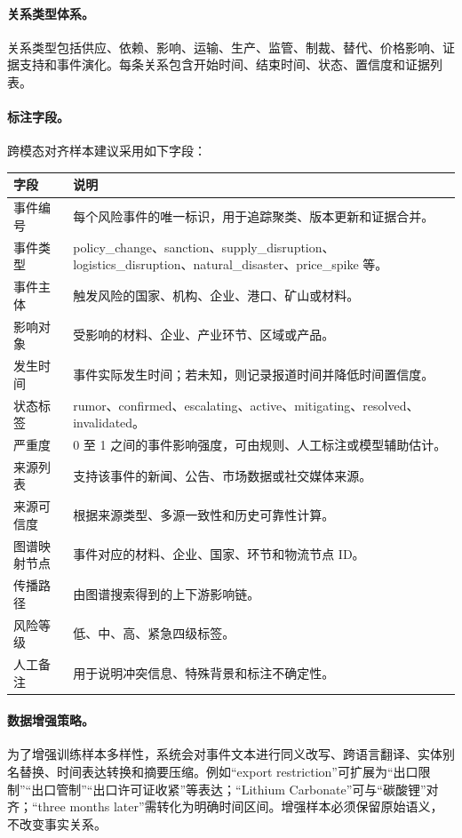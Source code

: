 \documentclass[12pt,a4paper]{article}
\begin{document}
\paragraph{关系类型体系。}关系类型包括供应、依赖、影响、运输、生产、监管、制裁、替代、价格影响、证据支持和事件演化。每条关系包含开始时间、结束时间、状态、置信度和证据列表。

\paragraph{标注字段。}跨模态对齐样本建议采用如下字段：
\begin{longtable}{p{}p{}}
\toprule
\textbf{字段} & \textbf{说明} \\
\midrule
事件编号 & 每个风险事件的唯一标识，用于追踪聚类、版本更新和证据合并。 \\
事件类型 & policy\_change、sanction、supply\_disruption、logistics\_disruption、natural\_disaster、price\_spike 等。 \\
事件主体 & 触发风险的国家、机构、企业、港口、矿山或材料。 \\
影响对象 & 受影响的材料、企业、产业环节、区域或产品。 \\
发生时间 & 事件实际发生时间；若未知，则记录报道时间并降低时间置信度。 \\
状态标签 & rumor、confirmed、escalating、active、mitigating、resolved、invalidated。 \\
严重度 & 0 至 1 之间的事件影响强度，可由规则、人工标注或模型辅助估计。 \\
来源列表 & 支持该事件的新闻、公告、市场数据或社交媒体来源。 \\
来源可信度 & 根据来源类型、多源一致性和历史可靠性计算。 \\
图谱映射节点 & 事件对应的材料、企业、国家、环节和物流节点 ID。 \\
传播路径 & 由图谱搜索得到的上下游影响链。 \\
风险等级 & 低、中、高、紧急四级标签。 \\
人工备注 & 用于说明冲突信息、特殊背景和标注不确定性。 \\
\bottomrule
\end{longtable}

\paragraph{数据增强策略。}为了增强训练样本多样性，系统会对事件文本进行同义改写、跨语言翻译、实体别名替换、时间表达转换和摘要压缩。例如“export restriction”可扩展为“出口限制”“出口管制”“出口许可证收紧”等表达；“Lithium Carbonate”可与“碳酸锂”对齐；“three months later”需转化为明确时间区间。增强样本必须保留原始语义，不改变事实关系。
\end{document}
